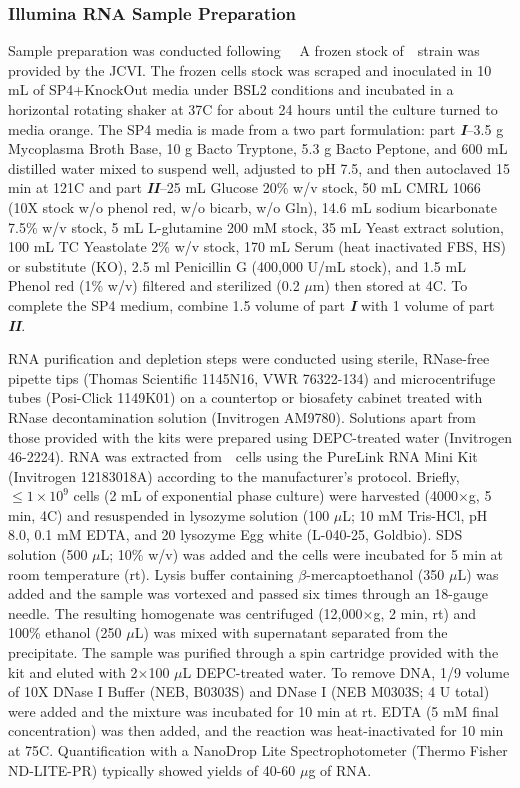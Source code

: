 \subsubsection{Illumina RNA Sample Preparation} \label{sec:methods-ill-prep}

Sample preparation was conducted following~\cite{grunberger_next_2019}~%
A frozen stock of~\syn~strain was provided by the JCVI.
The frozen cells stock was scraped and inoculated in 10 mL of SP4+KnockOut media under BSL2 conditions and incubated in a horizontal rotating shaker at 37\textdegree C for about 24 hours until the culture turned to media orange.
The SP4 media is made from a two part formulation: part \textbf{\textit{I}}--3.5 g Mycoplasma Broth Base, 10 g Bacto Tryptone, 5.3 g Bacto Peptone, and 600 mL distilled water mixed to suspend well, adjusted to pH 7.5, and then autoclaved 15 min at 121\textdegree C and part \textbf{\textit{II}}--25 mL Glucose 20\% w/v stock, 50 mL CMRL 1066 (10X stock w/o phenol red, w/o bicarb, w/o Gln), 14.6 mL sodium bicarbonate 7.5\% w/v stock, 5 mL L-glutamine 200 mM stock, 35 mL Yeast extract solution, 100 mL TC Yeastolate 2\% w/v stock, 170 mL Serum (heat inactivated FBS, HS) or substitute (KO), 2.5 ml Penicillin G (400,000 U/mL stock), and 1.5 mL Phenol red (1\% w/v) filtered and sterilized (0.2 $\mu$m) then stored at 4\textdegree C.
To complete the SP4 medium, combine 1.5 volume of part \textbf{\textit{I}} with 1 volume of part \textbf{\textit{II}}.

RNA purification and depletion steps were conducted using sterile, RNase-free pipette tips (Thomas Scientific 1145N16, VWR 76322-134) and microcentrifuge tubes (Posi-Click 1149K01) on a countertop or biosafety cabinet treated with RNase decontamination solution (Invitrogen AM9780).
Solutions apart from those provided with the kits were prepared using DEPC-treated water (Invitrogen 46-2224).
RNA was extracted from~\jsyn~cells using the PureLink RNA Mini Kit (Invitrogen 12183018A) according to the manufacturer’s protocol.
Briefly, $\le1\times10^{9}$ cells (2 mL of exponential phase culture) were harvested (4000$\times$g, 5 min, 4\textdegree C) and resuspended in lysozyme solution (100 $\mu$L; 10 mM Tris-HCl, pH 8.0, 0.1 mM EDTA, and 20  lysozyme Egg white (L-040-25, Goldbio).
SDS solution (500 $\mu$L; 10\% w/v) was added and the cells were incubated for 5 min at room temperature (rt).
Lysis buffer containing $\beta$-mercaptoethanol (350 $\mu$L) was added and the sample was vortexed and passed six times through an 18-gauge needle.
The resulting homogenate was centrifuged (12,000$\times$g, 2 min, rt) and 100\% ethanol (250 $\mu$L) was mixed with supernatant separated from the precipitate.
The sample was purified through a spin cartridge provided with the kit and eluted with 2$\times$100 $\mu$L DEPC-treated water.
To remove DNA, 1/9 volume of 10X DNase I Buffer (NEB, B0303S) and DNase I (NEB M0303S; 4 U total) were added and the mixture was incubated for 10 min at rt.
EDTA (5 mM final concentration) was then added, and the reaction was heat-inactivated for 10 min at 75\textdegree C.
Quantification with a NanoDrop Lite Spectrophotometer (Thermo Fisher ND-LITE-PR) typically showed yields of 40-60 $\mu$g of RNA.

